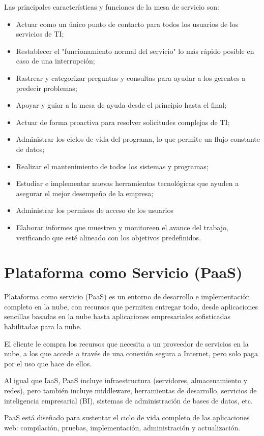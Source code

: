 Las principales características y funciones de la mesa de servicio son:
\begin{itemize}
	\item 	Actuar como un único punto de contacto para todos los usuarios de los servicios de TI;
\item 	Restablecer el "funcionamiento normal del servicio" lo más rápido posible en caso de una interrupción;
\item 	Rastrear y categorizar preguntas y consultas para ayudar a los gerentes a predecir problemas;
\item 	Apoyar y guiar a la mesa de ayuda desde el principio hasta el final;
\item 	Actuar de forma proactiva para resolver solicitudes complejas de TI;
\item 	Administrar los ciclos de vida del programa, lo que permite un flujo constante de datos;
\item 	Realizar el mantenimiento de todos los sistemas y programas;
\item 	Estudiar e implementar nuevas herramientas tecnológicas que ayuden a asegurar el mejor desempeño de la empresa;
\item 	Administrar los permisos de acceso de los usuarios
\item 	Elaborar informes que muestren y monitoreen el avance del trabajo, verificando que esté alineado con los objetivos predefinidos. 
\end{itemize}

\section{Plataforma como Servicio (PaaS)}
Plataforma como servicio (PaaS) es un entorno de desarrollo e implementación completo en la nube, con recursos que permiten entregar todo, desde aplicaciones sencillas basadas en la nube hasta aplicaciones empresariales sofisticadas habilitadas para la nube. 

El cliente le compra los recursos que necesita a un proveedor de servicios en la nube, a los que accede a través de una conexión segura a Internet, pero solo paga por el uso que hace de ellos.

Al igual que IaaS, PaaS incluye infraestructura (servidores, almacenamiento y redes), pero también incluye middleware, herramientas de desarrollo, servicios de inteligencia empresarial (BI), sistemas de administración de bases de datos, etc. 

PaaS está diseñado para sustentar el ciclo de vida completo de las aplicaciones web: compilación, pruebas, implementación, administración y actualización. 

